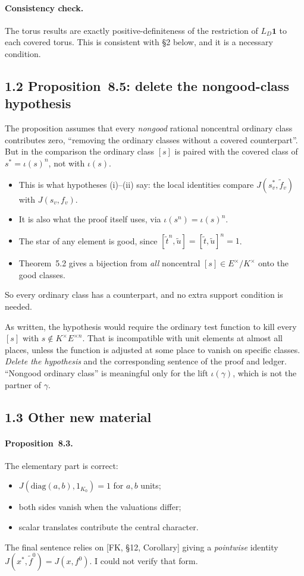 \documentclass[11pt]{article}
\theoremstyle{plain}
\begin{document}
\paragraph{Consistency check.} The torus results are exactly
positive-definiteness of the restriction of $L_D\mathbf 1$ to each
covered torus. This is consistent with \S2 below, and it is a necessary
condition.

\subsection*{1.2 Proposition~8.5: delete the nongood-class hypothesis}
The proposition assumes that every \emph{nongood} rational noncentral
ordinary class contributes zero, ``removing the ordinary classes without
a covered counterpart''. But in the comparison the ordinary class $[s]$
is paired with the covered class of $s^*=\iota(s)^n$, not with
$\iota(s)$.
\begin{itemize}
\item This is what hypotheses (i)--(ii) say: the local identities
compare $J(s_v^*,\tilde f_v)$ with $J(s_v,f_v)$.
\item It is also what the proof itself uses, via $\iota(s^n)=\iota(s)^n$.
\item The star of any element is good, since
$[\tilde t^n,\tilde u]=[\tilde t,\tilde u]^n=1$.
\item Theorem~5.2 gives a bijection from \emph{all} noncentral
$[s]\in E^\times/K^\times$ onto the good classes.
\end{itemize}
So every ordinary class has a counterpart, and no extra support
condition is needed.

As written, the hypothesis would require the ordinary test function to
kill every $[s]$ with $s\notin K^\times E^{\times n}$. That is
incompatible with unit elements at almost all places, unless the
function is adjusted at some place to vanish on specific classes.
\emph{Delete the hypothesis} and the corresponding sentence of the proof
and ledger. ``Nongood ordinary class'' is meaningful only for the
lift $\iota(\gamma)$, which is not the partner of $\gamma$.

\subsection*{1.3 Other new material}
\paragraph{Proposition~8.3.} The elementary part is correct:
\begin{itemize}
\item $J(\mathrm{diag}(a,b),1_{K_0})=1$ for $a,b$ units;
\item both sides vanish when the valuations differ;
\item scalar translates contribute the central character.
\end{itemize}
The final sentence relies on [FK, \S12, Corollary] giving a
\emph{pointwise} identity $J(x^*,\tilde f^0)=J(x,f^0)$. I could not
verify that form.
\end{document}
